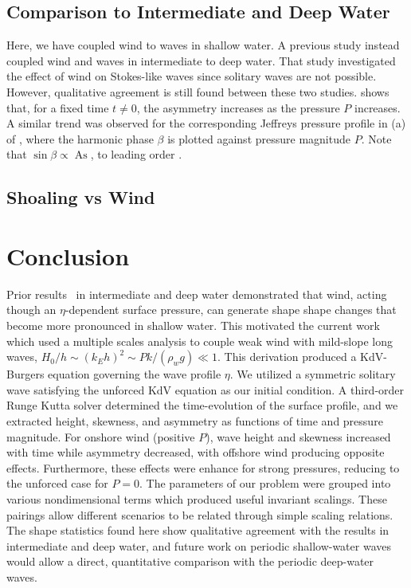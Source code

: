 \documentclass{jfm}
\DeclareMathOperator{\As}{As}
\begin{document}
\subsection{Comparison to Intermediate and Deep Water}
Here, we have coupled wind to waves in shallow water.
A previous study \citep{zdyrski2020wind} instead coupled wind and waves
in intermediate to deep water.
That study investigated the effect of wind on Stokes-like waves since
solitary waves are not possible.
However, qualitative agreement is still found between these two studies.
 shows that, for a fixed time $t \neq 0$,
the asymmetry increases as the pressure $P$ increases.
A similar trend was observed for the corresponding Jeffreys pressure
profile in (a) of \citet{zdyrski2020wind}, where the
harmonic phase $\beta$ is plotted against pressure magnitude $P$.
Note that $\sin{\beta} \propto \As$, to leading order \citep[\cf
eq.\ 3.55 of][]{zdyrski2020wind}.

\subsection{Shoaling vs Wind}

\section{Conclusion}
Prior results~\citep{zdyrski2020wind} in intermediate and deep water
demonstrated that wind, acting though an $\eta$-dependent surface
pressure, can generate shape shape changes that become more pronounced
in shallow water.
This motivated the current work which used a multiple scales analysis to
couple weak wind with mild-slope long waves, \ie $H_0/h \sim (k_E h)^2
\sim P k/(\rho_w g) \ll 1$.
This derivation produced a KdV-Burgers equation governing the wave
profile $\eta$.
We utilized a symmetric solitary wave satisfying the unforced KdV
equation as our initial condition.
A third-order Runge Kutta solver determined the time-evolution of the
surface profile, and we extracted height, skewness, and asymmetry as
functions of time and pressure magnitude.
For onshore wind (positive $P$), wave height and skewness increased with
time while asymmetry decreased, with offshore wind producing opposite
effects.
Furthermore, these effects were enhance for strong pressures, reducing
to the unforced case for $P=0$.
The parameters of our problem were grouped into various nondimensional
terms which produced useful invariant scalings.
These pairings allow different scenarios to be related through simple
scaling relations.
The shape statistics found here show qualitative agreement with the
results in intermediate and deep water, and future work on periodic
shallow-water waves would allow a direct, quantitative comparison with
the periodic deep-water waves.
\end{document}
